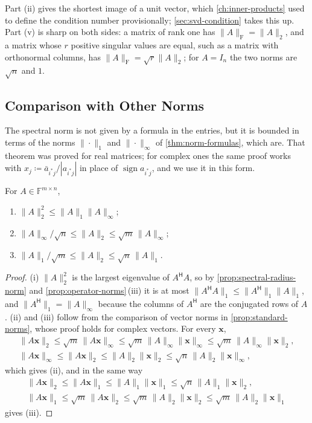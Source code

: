 Part (ii) gives the shortest image of a unit vector, which \cref{ch:inner-products} used to define the condition number provisionally; \cref{sec:svd-condition} takes this up. Part (v) is sharp on both sides: a matrix of rank one has $\|A\|_{\mathrm F}=\|A\|_2$, and a matrix whose $r$ positive singular values are equal, such as a matrix with orthonormal columns, has $\|A\|_{\mathrm F}=\sqrt r\|A\|_2$; for $A=I_n$ the two norms are $\sqrt n$ and $1$.

\subsection{Comparison with Other Norms}

The spectral norm is not given by a formula in the entries, but it is bounded in terms of the norms $\|\cdot\|_1$ and $\|\cdot\|_\infty$ of \cref{thm:norm-formulas}, which are. That theorem was proved for real matrices; for complex ones the same proof works with $x_j\coloneqq\bar a_{i^*j}/|a_{i^*j}|$ in place of $\operatorname{sign}a_{i^*j}$, and we use it in this form.

\begin{proposition}
\label{prop:norm-comparison}
For $A\in\mathbb F^{m\times n}$,
\begin{enumerate}
\item $\|A\|_2^2\le\|A\|_1\|A\|_\infty$;
\item $\|A\|_\infty/\sqrt n\le\|A\|_2\le\sqrt m\,\|A\|_\infty$;
\item $\|A\|_1/\sqrt m\le\|A\|_2\le\sqrt n\,\|A\|_1$.
\end{enumerate}
\end{proposition}

\begin{proof}
(i) $\|A\|_2^2$ is the largest eigenvalue of $A^{\mathsf H}A$, so by \cref{prop:spectral-radius-norm} and \cref{prop:operator-norms}\,(iii) it is at most $\|A^{\mathsf H}A\|_1\le\|A^{\mathsf H}\|_1\|A\|_1$, and $\|A^{\mathsf H}\|_1=\|A\|_\infty$ because the columns of $A^{\mathsf H}$ are the conjugated rows of $A$. (ii) and (iii) follow from the comparison of vector norms in \cref{prop:standard-norms}, whose proof holds for complex vectors. For every $\mathbf x$,
\begin{gather*}
\|A\mathbf x\|_2\le\sqrt m\,\|A\mathbf x\|_\infty\le\sqrt m\,\|A\|_\infty\|\mathbf x\|_\infty\le\sqrt m\,\|A\|_\infty\|\mathbf x\|_2,\\
\|A\mathbf x\|_\infty\le\|A\mathbf x\|_2\le\|A\|_2\|\mathbf x\|_2\le\sqrt n\,\|A\|_2\|\mathbf x\|_\infty ,
\end{gather*}
which gives (ii), and in the same way
\begin{gather*}
\|A\mathbf x\|_2\le\|A\mathbf x\|_1\le\|A\|_1\|\mathbf x\|_1\le\sqrt n\,\|A\|_1\|\mathbf x\|_2,\\
\|A\mathbf x\|_1\le\sqrt m\,\|A\mathbf x\|_2\le\sqrt m\,\|A\|_2\|\mathbf x\|_2\le\sqrt m\,\|A\|_2\|\mathbf x\|_1
\end{gather*}
gives (iii).
\end{proof}

